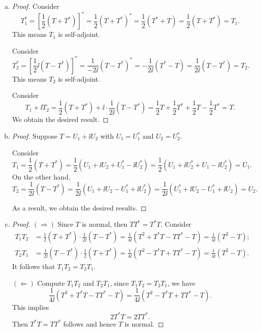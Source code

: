 \begin{Exercise}
	\begin{enumerate}[(a)]
		\item
		\begin{proof}
			Consider
			$$
			T_1^*
			= \left[ \frac{1}{2}(T+T^*) \right]^*
			= \frac{1}{2} (T+T^*)^*
			= \frac{1}{2} (T^*+T)
			= \frac{1}{2} (T + T^*)
			= T_1.
			$$
			This means $T_1$ is self-adjoint.
			
			Consider
			$$
			T_2^*
			= \left[ \frac{1}{2}\ii(T-T^*) \right]^*
			= \frac{1}{-2\ii}(T-T^*)^*
			= -\frac{1}{2\ii}(T^*-T)
			= \frac{1}{2\ii}(T-T^*)
			= T_2.
			$$
			This means $T_2$ is self-adjoint.
			
			Consider
			$$
			T_1 + \ii T_2
			= \frac{1}{2}(T+T^*) + \ii \cdot \frac{1}{2\ii} (T-T^*)
			= \frac{1}{2}T+ \frac{1}{2}T^* + \frac{1}{2}T - \frac{1}{2}T^*
			= T.
			$$
			We obtain the desired result.
		\end{proof}
		
		\item
		\begin{proof}
			Suppose $T = U_1+\ii U_2$ with $U_1 = U_1^*$ and $U_2 = U_2^*$.
			
			Consider
			$$
			T_1
			= \frac{1}{2}(T+T^*)
			= \frac{1}{2}(U_1 + \ii U_2 + U_1^* - \ii U_2^*)
			= \frac{1}{2}(U_1 + \ii U_2^* + U_1 - \ii U_2^*)
			= U_1.
			$$
			On the other hand,
			$$
			T_2
			= \frac{1}{2\ii}(T-T^*)
			= \frac{1}{2\ii}(U_1 + \ii U_2 - U_1^* + \ii U_2^*)
			= \frac{1}{2\ii}(U_1^*+\ii U_2 - U_1^* + \ii U_2)
			= U_2.
			$$
			
			As a result, we obtain the desired results.
		\end{proof}
		
		\item
		\begin{proof}
			$(\Longrightarrow)$
			Since $T$ is normal, then $T T^* = T^*T$. Consider
			\begin{align*}
			T_1 T_2 
			&= \frac{1}{2}(T+T^*)\cdot \frac{1}{2\ii}(T-T^*)
			= \frac{1}{4\ii}(T^2+T^* T-T T^*-T)
			= \frac{1}{4\ii}(T^2-T); \\
			T_2 T_1
			&= \frac{1}{2\ii}(T-T^*)\cdot \frac{1}{2}(T+T^*)
			= \frac{1}{4\ii}(T^2-T^*T+T T^*-T)
			= \frac{1}{4\ii}(T^2-T).
			\end{align*}
			It follows that $T_1 T_2 = T_2 T_1$.
			
			\vspace{2ex}
			
			$(\Longleftarrow)$
			Compute $T_1 T_2$ and $T_2 T_1$, since $T_1 T_2 = T_2 T_1$, we have
			$$
			\frac{1}{4\ii}(T^2+T^* T-T T^*-T)
			= \frac{1}{4\ii}(T^2-T^*T+T T^*-T).
			$$
			This implies
			$$
			2T^* T = 2T T^*.
			$$
			Then $T^* T = T T^*$ follows and hence $T$ is normal.
		\end{proof}
	\end{enumerate}
\end{Exercise}